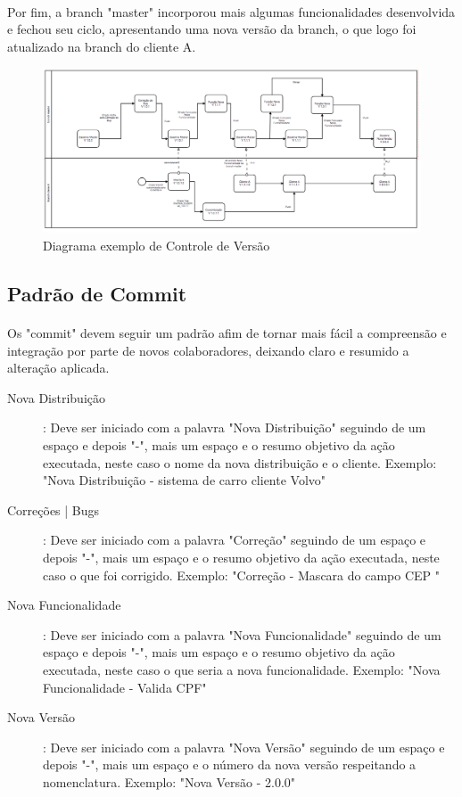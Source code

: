 \documentclass[	DIV=calc,%
							paper=a4,%
							fontsize=12pt,%
							onecolumn]{scrartcl}	 					%
\begin{document}
\paragraph{}
Por fim, a branch "master" incorporou mais algumas funcionalidades desenvolvida e fechou seu ciclo, apresentando uma nova versão da branch, o que logo foi atualizado na branch do cliente A.

\begin{figure}[!h]
	\includegraphics[scale=0.4]{diagrama_branch}
	\caption{Diagrama exemplo de Controle de Versão}
\end{figure}

\subsection{Padrão de Commit}
\paragraph{}
Os "commit" devem seguir um padrão afim de tornar mais fácil a compreensão e integração por parte de novos colaboradores, deixando claro e resumido a alteração aplicada.
\begin{description}
	\item[Nova Distribuição]: Deve ser iniciado com a palavra "Nova Distribuição" seguindo de um espaço e depois "-", mais um espaço e o resumo objetivo da ação executada, neste caso o nome da nova distribuição e o cliente. Exemplo: "Nova Distribuição - sistema de carro cliente Volvo"
	\item[Correções | Bugs]: Deve ser iniciado com a palavra "Correção" seguindo de um espaço e depois "-", mais um espaço e o resumo objetivo da ação executada, neste caso o que foi corrigido. Exemplo: "Correção - Mascara do campo CEP "
	\item[Nova Funcionalidade]: Deve ser iniciado com a palavra "Nova Funcionalidade" seguindo de um espaço e depois "-", mais um espaço e o resumo objetivo da ação executada, neste caso o que seria a nova funcionalidade. Exemplo: "Nova Funcionalidade - Valida CPF"
	\item[Nova Versão]: Deve ser iniciado com a palavra "Nova Versão" seguindo de um espaço e depois "-", mais um espaço e o número da nova versão respeitando a nomenclatura. Exemplo: "Nova Versão - 2.0.0"
\end{description}
\end{document}
